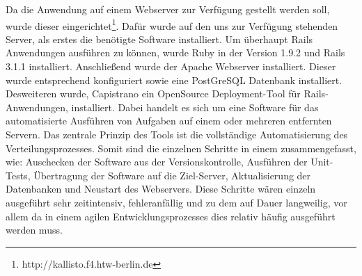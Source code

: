 Da die Anwendung auf einem Webserver zur Verfügung gestellt werden soll, wurde dieser eingerichtet\footnote{http://kallisto.f4.htw-berlin.de}. Dafür wurde auf den uns zur Verfügung stehenden Server, als erstes die benötigte Software installiert. Um überhaupt Rails Anwendungen ausführen zu können, wurde Ruby in der Version 1.9.2 und Rails 3.1.1 installiert. Anschließend wurde der Apache Webserver installiert. Dieser wurde entsprechend konfiguriert sowie eine PostGreSQL Datenbank installiert. Desweiteren wurde, Capistrano ein OpenSource Deployment-Tool für Rails-Anwendungen, installiert. Dabei handelt es sich um eine Software für das automatisierte Ausführen von Aufgaben auf einem oder mehreren entfernten Servern. Das zentrale Prinzip des Tools ist die vollständige Automatisierung des Verteilungsprozesses. Somit sind die einzelnen Schritte in einem zusammengefasst, wie: Auschecken der Software aus der Versionskontrolle, Ausführen der Unit-Tests, Übertragung der Software auf die Ziel-Server, Aktualisierung der Datenbanken und Neustart des Webservers. Diese Schritte wären einzeln ausgeführt sehr zeitintensiv, fehleranfällig und zu dem auf Dauer langweilig, vor allem da in einem agilen Entwicklungsprozesses dies relativ häufig ausgeführt werden muss.